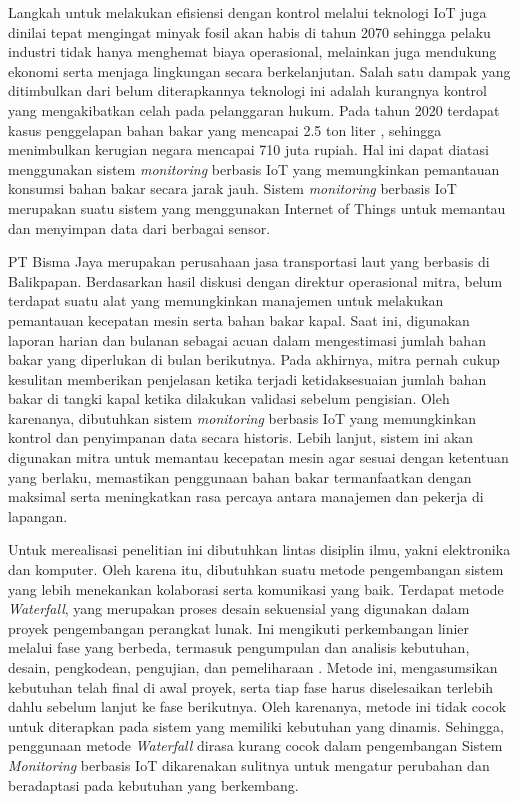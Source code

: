 Langkah untuk melakukan efisiensi dengan kontrol melalui teknologi IoT juga dinilai tepat mengingat minyak fosil akan habis di tahun 2070 \parencite{misc:bp} sehingga pelaku industri tidak hanya menghemat biaya operasional, melainkan juga mendukung ekonomi serta menjaga lingkungan secara berkelanjutan. Salah satu dampak yang ditimbulkan dari belum diterapkannya teknologi ini adalah kurangnya kontrol yang mengakibatkan celah pada pelanggaran hukum. Pada tahun 2020 terdapat kasus penggelapan bahan bakar yang mencapai 2.5 ton liter \parencite{misc:aditya}, sehingga menimbulkan kerugian negara mencapai 710 juta rupiah. Hal ini dapat diatasi menggunakan sistem \textit{monitoring} berbasis IoT yang memungkinkan pemantauan konsumsi bahan bakar secara jarak jauh. Sistem \textit{monitoring} berbasis IoT merupakan suatu sistem yang menggunakan Internet of Things untuk memantau dan menyimpan data dari berbagai sensor.

PT Bisma Jaya merupakan perusahaan jasa transportasi laut yang berbasis di Balikpapan. Berdasarkan hasil diskusi dengan direktur operasional mitra, belum terdapat suatu alat yang memungkinkan manajemen untuk melakukan pemantauan kecepatan mesin serta bahan bakar kapal.  Saat ini, digunakan laporan harian dan bulanan sebagai acuan dalam mengestimasi jumlah bahan bakar yang diperlukan di bulan berikutnya. Pada akhirnya, mitra pernah cukup kesulitan memberikan penjelasan ketika terjadi ketidaksesuaian jumlah bahan bakar di tangki kapal ketika dilakukan validasi sebelum pengisian. Oleh karenanya, dibutuhkan sistem \textit{monitoring} berbasis IoT yang memungkinkan kontrol dan penyimpanan data secara historis. Lebih lanjut, sistem ini akan digunakan mitra untuk memantau kecepatan mesin agar sesuai dengan ketentuan yang berlaku, memastikan penggunaan bahan bakar termanfaatkan dengan maksimal serta meningkatkan rasa percaya antara manajemen dan pekerja di lapangan. 

Untuk merealisasi penelitian ini dibutuhkan lintas disiplin ilmu, yakni elektronika dan komputer. Oleh karena itu, dibutuhkan suatu metode pengembangan sistem yang lebih menekankan kolaborasi serta komunikasi yang baik. Terdapat metode \textit{Waterfall}, yang merupakan proses desain sekuensial yang digunakan dalam proyek pengembangan perangkat lunak. Ini mengikuti perkembangan linier melalui fase yang berbeda, termasuk pengumpulan dan analisis kebutuhan, desain, pengkodean, pengujian, dan pemeliharaan \parencite{article:abbas}. Metode ini, mengasumsikan kebutuhan telah final di awal proyek, serta tiap fase harus diselesaikan terlebih dahlu sebelum lanjut ke fase berikutnya. Oleh karenanya, metode ini tidak cocok untuk diterapkan pada sistem yang memiliki kebutuhan yang dinamis. Sehingga, penggunaan metode \textit{Waterfall} dirasa kurang cocok dalam pengembangan Sistem \textit{Monitoring} berbasis IoT dikarenakan sulitnya untuk mengatur perubahan dan beradaptasi pada kebutuhan yang berkembang.

